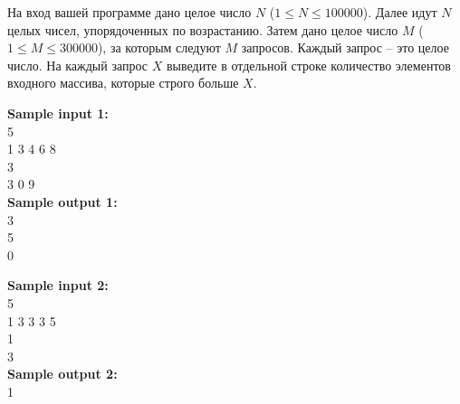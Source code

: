 \documentclass[a4paper]{article}
\begin{document}
На вход вашей программе дано целое число $N$ ($1 \le N \le 100000$). Далее идут $N$ целых чисел, упорядоченных по возрастанию. Затем дано целое число $M$ ($1 \le M \le 300000$), за которым следуют $M$ запросов. Каждый запрос -- это целое число. На каждый запрос $X$ выведите в отдельной строке количество элементов входного массива, которые строго больше $X$.

\LINE

\noindent \textbf{Sample input 1:}\\
5\\
1 3 4 6 8\\
3\\
3 0 9\\

\noindent \textbf{Sample output 1:}\\
3\\
5\\
0\\

\SPACE

\noindent \textbf{Sample input 2:}\\
5\\
1 3 3 3 5\\
1\\
3\\

\noindent \textbf{Sample output 2:}\\
1\\
\end{document}
